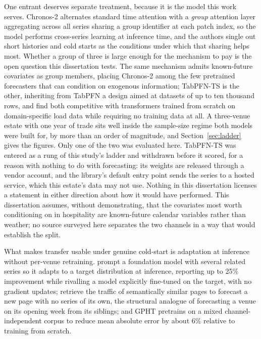 One entrant deserves separate treatment, because it is the model this work
serves. Chronos-2 \citep[a 2025 preprint]{ansari_chronos-2_2025} alternates
standard time attention with a \emph{group} attention layer aggregating across
all series sharing a group identifier at each patch index, so the model performs
cross-series learning at inference time, and the authors single out short
histories and cold starts as the conditions under which that sharing helps most.
Whether a group of three is large enough for the mechanism to pay is the open
question this dissertation tests. The same mechanism admits known-future
covariates as group members, placing Chronos-2 among the few pretrained
forecasters that can condition on exogenous information; TabPFN-TS
\citep[a 2026 preprint]{hoo_tables_2026} is the other, inheriting from TabPFN
\citep{hollmann_accurate_2025} a design aimed at datasets of up to ten thousand
rows, and \citet{hertel_explainable_2026} find both competitive with transformers
trained from scratch on domain-specific load data while requiring no training
data at all. A three-venue estate with one year of trade sits well inside the
sample-size regime both models were built for, by more than an order of
magnitude, and Section~\ref{sec:ladder} gives the figures. Only one of the two
was evaluated here. TabPFN-TS was entered as a rung of this study's ladder and
withdrawn before it scored, for a reason with nothing to do with forecasting:
its weights are released through a vendor account, and the library's default
entry point sends the series to a hosted service, which this estate's data may
not use. Nothing in this dissertation licenses a statement in either direction
about how it would have performed. This dissertation assumes, without
demonstrating, that the covariates most worth conditioning on in hospitality are
known-future calendar variables rather than weather; no source surveyed here
separates the two channels in a way that would establish the split.

What makes transfer usable under genuine cold-start is adaptation at inference
without per-venue retraining. \citet{das_-context_2025} prompt a foundation model
with several related series so it adapts to a target distribution at inference,
reporting up to 25\% improvement while rivalling a model explicitly fine-tuned on
the target, with no gradient updates; \citet{zhou_context-driven_2025} retrieve
the traffic of semantically similar pages to forecast a new page with no series
of its own, the structural analogue of forecasting a venue on its opening week
from its siblings; and GPHT \citep{liu_generative_2024} pretrains on a mixed
channel-independent corpus to reduce mean absolute error by about 6\% relative to
training from scratch.

